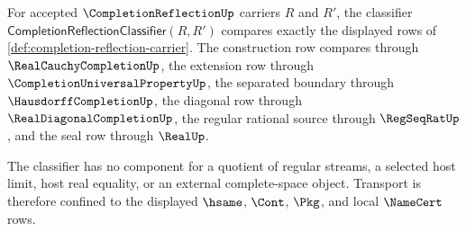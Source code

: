 \begin{definition}
\label{def:completion-reflection-classifier}
For accepted $\CompletionReflectionUp$ carriers $R$ and $R'$, the classifier $\mathsf{CompletionReflectionClassifier}(R,R')$ compares exactly the displayed rows of \autoref{def:completion-reflection-carrier}. The construction row compares through $\RealCauchyCompletionUp$, the extension row through $\CompletionUniversalPropertyUp$, the separated boundary through $\HausdorffCompletionUp$, the diagonal row through $\RealDiagonalCompletionUp$, the regular rational source through $\RegSeqRatUp$, and the seal row through $\RealUp$.

The classifier has no component for a quotient of regular streams, a selected host limit, host real equality, or an external complete-space object. Transport is therefore confined to the displayed $\hsame$, $\Cont$, $\Pkg$, and local $\NameCert$ rows.
\end{definition}

